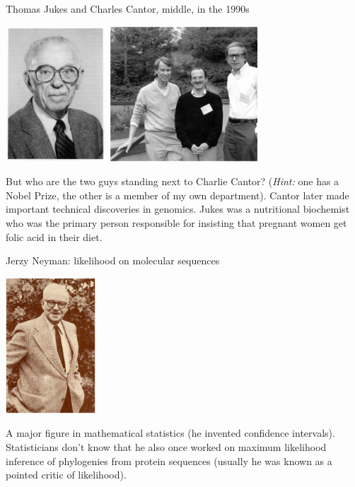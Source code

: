 \documentclass[bluish,slideColor,colorBG,pdf]{prosper}
\begin{document}
\begin{slide}[Replace]{Thomas Jukes and Charles Cantor, middle, in the 1990s}

\begin{center}
\includegraphics[height=2in]{jukes.ps} \includegraphics[height=2in]{cantor.ps}
\end{center}
\bigskip

But who are the two guys standing next to Charlie Cantor? ({\it Hint:} one has a Nobel
Prize, the other is a member of my own department).  Cantor later made important technical discoveries in genomics.  Jukes was
a nutritional biochemist who was the primary person responsible for insisting
that pregnant women get folic acid in their diet.

\end{slide}

\begin{slide}[Replace]{Jerzy Neyman: likelihood on molecular sequences}

\centerline{\includegraphics[height=2in]{neyman.ps}}
\bigskip

A major figure in mathematical statistics (he invented confidence intervals).
Statisticians don't know that he also
once worked on maximum likelihood inference of phylogenies from protein
sequences (usually he was known as a pointed critic of likelihood).

\end{slide}
\end{document}
